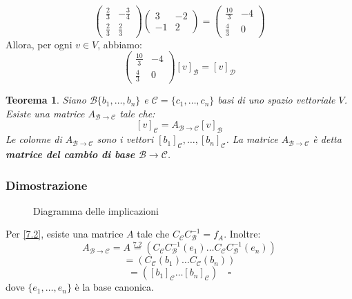 \documentclass[a4paper]{article}
\newtheorem{theorem}{Teorema}
\theoremstyle{break}
\theoremstyle{break}
\theoremstyle{break}
\theoremstyle{break}
\begin{document}
\begin{example}
\[\begin{pmatrix}
    \frac{2}{3} & -\frac{3}{4}\\
    \frac{2}{3} & \frac{2}{3}
  \end{pmatrix}
  \begin{pmatrix} 
    3 & -2\\
    -1 & 2
  \end{pmatrix}
  = \begin{pmatrix} 
    \frac{10}{3} & -4\\
    \frac{4}{3} & 0
  \end{pmatrix}
\] 
Allora, per ogni \( v \in V \), abbiamo:
\[
\begin{pmatrix} 
  \frac{10}{3} & -4\\
  \frac{4}{3} & 0
\end{pmatrix}[v]_{\mathcal{B}} = [v]_{\mathcal{D}}
\] 
\end{example}

\begin{theorem}
  Siano \( \mathcal{B} \{b_1, \ldots, b_n\}  \) e \( \mathcal{C} = \{c_1, \ldots, c_n\}  \)
  basi di uno spazio vettoriale \( V \). Esiste una matrice \( A_{\mathcal{B} \to \mathcal{C}} \) 
  tale che:
  \[
    [v]_{\mathcal{C}} = A_{\mathcal{B} \to \mathcal{C}}[v]_{\mathcal{B}}
  \] 
  Le colonne di \( A_{\mathcal{B} \to \mathcal{C}} \) sono i vettori \( [b_1]_{\mathcal{C}},
  \ldots, [b_n]_{\mathcal{C}}\). La matrice \( A_{\mathcal{B} \to \mathcal{C}} \) è detta
  \textbf{matrice del cambio di base \( \mathcal{B} \to \mathcal{C} \)}.
\end{theorem}

\subsubsection{Dimostrazione}
\begin{figure}[H]
  \centering
  \caption{Diagramma delle implicazioni}
\end{figure}

Per \ref{7.2}, esiste una matrice \( A \) tale che \( C_{\mathcal{C}} C_{\mathcal{B}}^{-1} = f_A \).
Inoltre:
\[
 A_{\mathcal{B} \to \mathcal{C}} = A \stackrel{7.2}{=} \left( C_{\mathcal{C}} C_{\mathcal{B}}^{-1}(e_1) \ldots C_{\mathcal{C}} C_{\mathcal{B}}^{-1}(e_n) \right)
\] 
\[
  = \left( C_{\mathcal{C}}(b_1) \ldots C_{\mathcal{C}}(b_n) \right)
\] 
\[
  = \left( [b_1]_{\mathcal{C}} \ldots [b_n]_{\mathcal{C}} \right) \quad \square
\] 
dove \( \{e_1, \ldots, e_n\}  \) è la base canonica.
\end{document}
